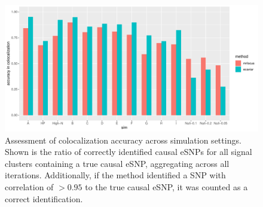 \documentclass[11pt]{article}
\begin{document}
\begin{figure}[!ht]
  \centering
  \includegraphics[width=.9\textwidth]{figs/assess_coloc}
  \caption{Assessment of colocalization accuracy across simulation
    settings. Shown is the ratio of correctly identified causal eSNPs
    for all signal clusters containing a true causal eSNP, aggregating
    across all iterations. Additionally, if the method identified a
    SNP with correlation of $> 0.95$ to the true causal eSNP, it was
    counted as a correct identification.}
\end{figure}
\end{document}
